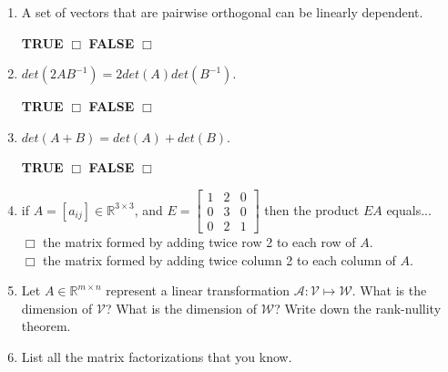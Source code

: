 \documentclass[14pt]{report}
\begin{document}
\begin{enumerate}
\item A set of vectors that are pairwise orthogonal can be
  linearly dependent. 

\quad \textbf{TRUE} $\Box$ \quad\textbf{FALSE} $\Box$ 

\item $det(2AB^{-1})=2det(A)det(B^{-1})$. 

\quad \textbf{TRUE} $\Box$ \quad\textbf{FALSE} $\Box$ 

\item $det(A+B)=det(A)+det(B)$.

 \quad \textbf{TRUE} $\Box$ \quad\textbf{FALSE} $\Box$ 
  



\item if $A=[a_{ij}]\in\mathbb{R}^{3\times 3}$, and $E=\left[\begin{array}{ccc}
  1&2&0\\0&3&0\\0&2&1\end{array}\right]$ then the product $EA$ equals...\\

     $\Box$ the matrix formed by adding twice row 2 to each row of $A$.\\
     $\Box$ the matrix formed by adding twice column 2 to each column of $A$. 


\item Let $A\in\mathbb{R}^{m\times n}$ represent a linear transformation
  $\mathcal{A}:\mathcal{V}\mapsto \mathcal{W}$. What is the dimension of $\mathcal{V}$?
What is the dimension of $\mathcal{W}$? Write down the rank-nullity theorem.


\item List all the matrix factorizations that you know.


%



\end{enumerate}
\end{document}
